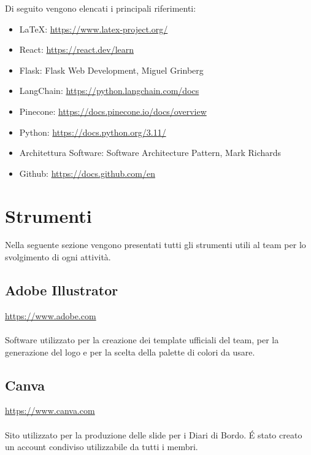 \documentclass[10pt, a4paper]{article}
\begin{document}
Di seguito vengono elencati i principali riferimenti:
\begin{itemize}
    \item \LaTeX: \href{https://www.latex-project.org/}{https://www.latex-project.org/}
    \item React: \href{https://react.dev/learn}{https://react.dev/learn}
    \item Flask: Flask Web Development, Miguel Grinberg
    \item LangChain: \href{https://python.langchain.com/docs}{https://python.langchain.com/docs}
    \item Pinecone: \href{https://docs.pinecone.io/docs/overview}{https://docs.pinecone.io/docs/overview}
    \item Python: \href{https://docs.python.org/3.11/}{https://docs.python.org/3.11/}
    \item Architettura Software: Software Architecture Pattern, Mark Richards
    \item Github: \href{https://docs.github.com/en}{https://docs.github.com/en}
\end{itemize}

\newpage

\newpage
\section{Strumenti}
Nella seguente sezione vengono presentati tutti gli strumenti utili al team per lo svolgimento di ogni attività.

\subsection{Adobe Illustrator}
\href{https://www.adobe.com}{https://www.adobe.com}\\\\
Software utilizzato per la creazione dei template ufficiali del team, per la generazione del logo e per la scelta della palette di colori da usare. 

\subsection{Canva}
\href{https://www.canva.com}{https://www.canva.com}\\\\
Sito utilizzato per la produzione delle slide per i Diari di Bordo. É stato creato un account condiviso utilizzabile da tutti i membri.
\end{document}

